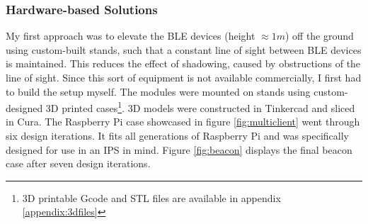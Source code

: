 \documentclass[a4paper, oneside]{ipsreport}
\begin{document}
\subsubsection{Hardware-based Solutions}
My first approach was to elevate the BLE devices (height $\approx 1m$) off the ground using custom-built stands, such that a constant line of sight between BLE devices is maintained. This reduces the effect of shadowing, caused by obstructions of the line of sight. Since this sort of equipment is not available commercially, I first had to build the setup myself. The modules were mounted on stands using custom-designed 3D printed cases\footnote{3D printable Gcode and STL files are available in appendix \ref{appendix:3dfiles} }. 3D models were constructed in Tinkercad and sliced in Cura. The Raspberry Pi case showcased in figure \ref{fig:multiclient} went through six design iterations. It fits all generations of Raspberry Pi and was specifically designed for use in an IPS in mind. Figure \ref{fig:beacon} displays the final beacon case after seven design iterations.
\end{document}
